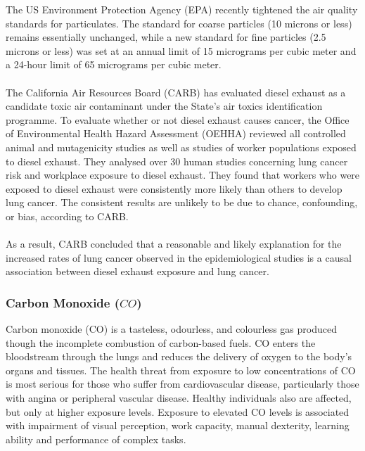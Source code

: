 The US Environment Protection Agency (EPA) recently tightened the air quality standards for particulates. The standard for coarse particles (10 microns or less) remains essentially unchanged, while a new standard for fine particles (2.5 microns or less) was set at an annual limit of 15 micrograms per cubic meter and a 24-hour limit of 65 micrograms per cubic meter.\\\\
The California Air Resources Board (CARB) has evaluated diesel exhaust as a candidate toxic air
contaminant under the State's air toxics identification programme. To evaluate whether or not diesel exhaust causes cancer, the Office of Environmental Health Hazard Assessment (OEHHA) reviewed all controlled animal and mutagenicity studies as well as studies of worker populations exposed to diesel exhaust. They analysed over 30 human studies concerning lung cancer risk and workplace exposure to diesel exhaust. They found that workers who were exposed to diesel exhaust were consistently more likely than others to develop lung cancer. The consistent results are unlikely to be due to chance, confounding, or bias, according to CARB.\\\\
As a result, CARB concluded that a reasonable and likely explanation for the increased rates of lung cancer observed in the epidemiological studies is a causal association between diesel exhaust exposure and lung cancer.
%
\subsubsection{Carbon Monoxide ($ CO $)}
Carbon monoxide (CO) is a tasteless, odourless, and colourless gas produced though the incomplete combustion of carbon-based fuels. CO enters the bloodstream through the lungs and reduces the delivery of oxygen to the body’s organs and tissues. The health threat from exposure to low concentrations of CO is most serious for those who suffer from cardiovascular disease, particularly those with angina or peripheral vascular disease. Healthy individuals also are affected, but only at higher exposure levels. Exposure to elevated CO levels is associated with impairment of visual perception, work capacity, manual dexterity, learning ability and performance of complex tasks.
